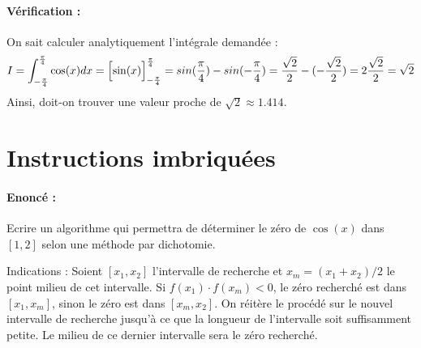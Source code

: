 \documentclass[11pt,a4paper]{article}
\begin{document}
\paragraph{Vérification :}
On sait calculer analytiquement l'intégrale demandée :
$$I = \int_{-\frac{\pi}{4}}^{\frac{\pi}{4}} \cos(x) dx = \left[\sin(x)\rule[-0.25cm]{0cm}{0.5cm}\right]_{-\frac{\pi}{4}}^{\frac{\pi}{4}} = sin(\frac{\pi}{4}) - sin(-\frac{\pi}{4}) = \frac{\sqrt{2}}{2} - (-\frac{\sqrt{2}}{2}) =  2\frac{\sqrt{2}}{2} = \sqrt{2}$$
Ainsi, doit-on trouver une valeur proche de $\sqrt{2} \approx 1.414$.

\section{Instructions imbriquées}

\paragraph{Enoncé :}
Ecrire un algorithme qui permettra de déterminer le zéro de $\cos(x)$ dans $[1,2]$ selon une méthode
par dichotomie.

\begin{minipage}{6cm}
\end{minipage}
\hfill
\begin{minipage}{8cm}
Indications : Soient $[x_1,x_2]$ l'intervalle de recherche et $x_m = (x_1+x_2)/2$ le point milieu 
de cet intervalle. Si $f(x_1)\cdot f(x_m) < 0$, le zéro recherché est dans $[x_1,x_m]$, sinon le
zéro est dans $[x_m,x_2]$. On réitère le procédé sur le nouvel intervalle de recherche jusqu'à ce que
la longueur de l'intervalle soit suffisamment petite. Le milieu de ce dernier intervalle sera le
zéro recherché.
\end{minipage}
\end{document}
